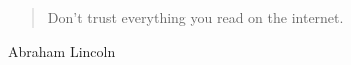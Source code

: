 \documentclass[a4paper,12pt,twoside]{article}
\begin{document}
    \begin{multicols}{2}
        \lipsum

        \lipsum
    \end{multicols}


    \blockquote{Don't trust everything you read on the internet.}{Abraham Lincoln}

    \lipsum
\end{document}
